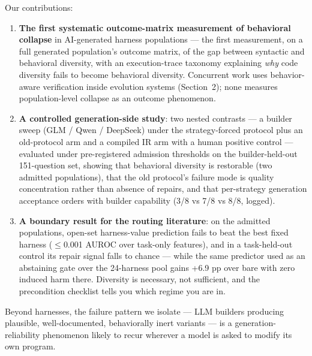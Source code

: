 Our contributions:

\begin{enumerate}
\def\labelenumi{\arabic{enumi}.}
\tightlist
\item
  \textbf{The first systematic outcome-matrix measurement of behavioral
  collapse} in AI-generated harness populations --- the first
  measurement, on a full generated population's outcome matrix, of the
  gap between syntactic and behavioral diversity, with an
  execution-trace taxonomy explaining \emph{why} code diversity fails to
  become behavioral diversity. Concurrent work uses behavior-aware
  verification inside evolution systems (Section~2); none measures
  population-level collapse as an outcome phenomenon.
\item
  \textbf{A controlled generation-side study}: two nested contrasts ---
  a builder sweep (GLM / Qwen / DeepSeek) under the strategy-forced
  protocol plus an old-protocol arm and a compiled IR arm with a human
  positive control --- evaluated under pre-registered admission
  thresholds on the builder-held-out 151-question set, showing that
  behavioral diversity is restorable (two admitted populations), that
  the old protocol's failure mode is quality concentration rather than
  absence of repairs, and that per-strategy generation acceptance orders
  with builder capability (3/8 vs 7/8 vs 8/8, logged).
\item
  \textbf{A boundary result for the routing literature}: on the admitted
  populations, open-set harness-value prediction fails to beat the best
  fixed harness ($\leq$0.001 AUROC over task-only features), and in a
  task-held-out control its repair signal falls to chance --- while the
  same predictor used as an abstaining gate over the 24-harness pool
  gains +6.9 pp over bare with zero induced harm there. Diversity is
  necessary, not sufficient, and the precondition checklist tells you
  which regime you are in.
\end{enumerate}

Beyond harnesses, the failure pattern we isolate --- LLM builders
producing plausible, well-documented, behaviorally inert variants --- is
a generation-reliability phenomenon likely to recur wherever a model is
asked to modify its own program.
